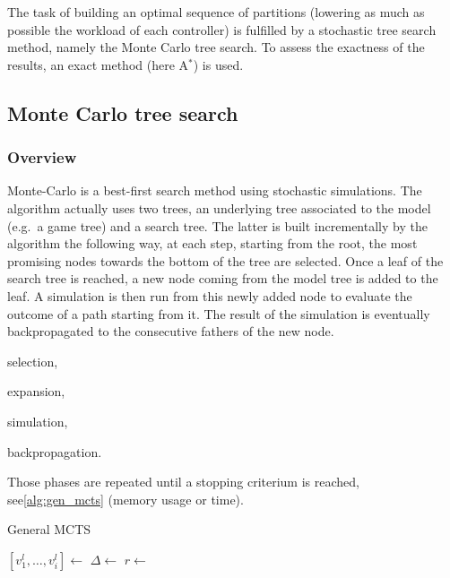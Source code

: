 \documentclass[twoside,twocolumn]{article}
\begin{document}
The task of building an optimal sequence of partitions (lowering
as much as possible the workload of each controller) is fulfilled by a
stochastic tree search method, namely the Monte Carlo tree search. To assess the
exactness of the results, an exact method (here A\(^*\)) is used.

\subsection{Monte Carlo tree search}
\subsubsection{Overview}
Monte-Carlo is a best-first search method using stochastic simulations. The
algorithm actually uses two trees, an underlying tree associated to the model
(e.g.\ a game tree) and a search tree. The latter is built incrementally by the
algorithm the following way, at each step, starting from the root, the most
promising nodes towards the bottom of the tree are selected. Once a leaf of the
search tree is reached, a new node coming from the model tree is added to the
leaf. A simulation is then run from this newly added node to evaluate the
outcome of a path starting from it. The result of the simulation is eventually
backpropagated to the consecutive fathers of the new node.
\begin{compactenum}
    \item selection,
    \item expansion,
    \item simulation,
    \item backpropagation.
\end{compactenum}
Those phases are repeated until a stopping criterium is reached,
see\ref{alg:gen_mcts} (memory usage or time).
\begin{algorithm}
    \caption{General MCTS~\cite{browne2012survey}}\label{alg:gen_mcts}
    \begin{algorithmic}
        \State{} \([v^l_1, \dots, v^l_i] \gets\) 
        \State{} \(\Delta \gets\) 
        \State{} \(r \gets\) 
        \State{} 
        \EndWhile{}
        \EndProcedure{}
    \end{algorithmic}
\end{algorithm}
\end{document}
